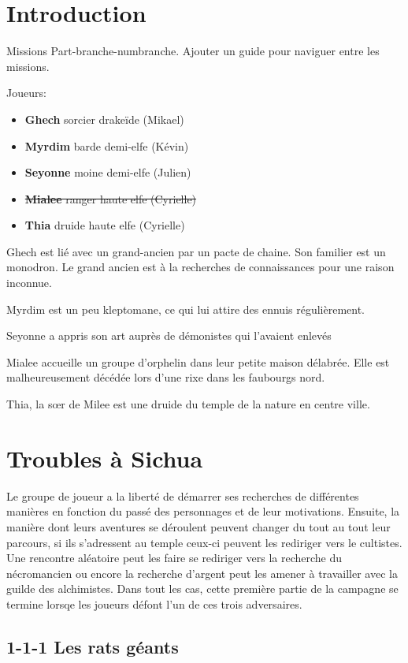 \section{Introduction}

Missions Part-branche-numbranche. Ajouter un guide pour naviguer entre les missions.

Joueurs:
\begin{itemize}
  \item {\bf Ghech} sorcier drakeïde (Mikael)
  \item {\bf Myrdim} barde demi-elfe (Kévin)
  \item {\bf Seyonne} moine demi-elfe (Julien)
  \item \sout{{\bf Mialee} ranger haute elfe (Cyrielle)}
  \item {\bf Thia} druide haute elfe (Cyrielle)
\end{itemize}

Ghech est lié avec un grand-ancien par un pacte de chaine. Son familier est un 
monodron. Le grand ancien est à la recherches de connaissances pour une raison
inconnue.

Myrdim est un peu kleptomane, ce qui lui attire des ennuis régulièrement.

Seyonne a appris son art auprès de démonistes qui l'avaient enlevés

Mialee accueille un groupe d'orphelin dans leur petite maison délabrée. Elle
est malheureusement décédée lors d'une rixe dans les faubourgs nord.

Thia, la s\oe{}r de Milee est une druide du temple de la nature en centre ville.

\section{Troubles à Sichua}

Le groupe de joueur a la liberté de démarrer ses recherches de différentes manières en fonction
du passé des personnages et de leur motivations. Ensuite, la manière dont leurs aventures se déroulent
peuvent changer du tout au tout leur parcours, si ils s'adressent au temple ceux-ci peuvent les rediriger 
vers le cultistes. Une rencontre aléatoire peut les faire se rediriger vers la recherche du nécromancien 
ou encore la recherche d'argent peut les amener à travailler avec la guilde des alchimistes. Dans tout
les cas, cette première partie de la campagne se termine lorsqe les joueurs défont l'un de ces trois
adversaires.

\subsection*{1-1-1 Les rats géants}

